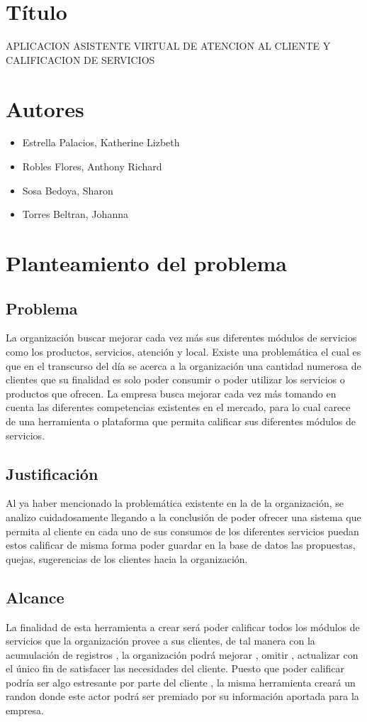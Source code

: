 \documentclass[preprint,12pt]{elsarticle}
\begin{document}
\section{Título}
APLICACION ASISTENTE VIRTUAL DE ATENCION AL CLIENTE Y CALIFICACION DE SERVICIOS

\section{Autores}
\begin{itemize}
	\item Estrella Palacios, Katherine Lizbeth
	\item Robles Flores, Anthony Richard
	\item Sosa Bedoya, Sharon
	\item Torres Beltran, Johanna    
\end{itemize}

\section{Planteamiento del problema}
	\subsection{Problema }	
		La organización buscar mejorar cada vez más sus diferentes módulos de servicios como los productos, servicios, atención y local.
		Existe una problemática el cual es que en el transcurso del día se acerca a la organización una cantidad numerosa de clientes que su finalidad es solo poder consumir o poder utilizar los servicios o productos que ofrecen.
		La empresa busca mejorar cada vez más tomando en cuenta las diferentes competencias existentes en el mercado, para lo cual carece de una herramienta o plataforma que permita calificar sus diferentes módulos de servicios.

	\subsection{Justificación }	
		Al ya haber mencionado la problemática existente en la de la organización, se analizo cuidadosamente llegando  a la conclusión de poder ofrecer una sistema que permita al cliente en cada uno de sus consumos de los diferentes servicios puedan estos calificar de 			misma forma poder guardar en la base de datos las propuestas, quejas, sugerencias de los clientes hacia la organización.
	\subsection{Alcance }
		La finalidad de esta herramienta a crear será poder calificar todos los módulos de servicios que la organización provee a sus clientes, de tal manera con la acumulación de registros , la organización podrá mejorar , omitir , actualizar con el único fin de satisfacer las 			necesidades del cliente.
		Puesto que poder calificar podría ser algo estresante por parte del cliente , la misma herramienta creará un randon donde este actor podrá ser premiado por su información aportada para la empresa.
\end{document}
